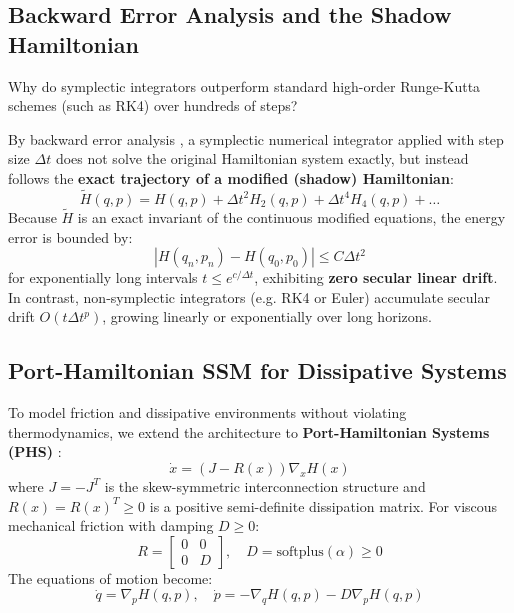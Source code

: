 \documentclass[11pt,a4paper]{article}
\begin{document}
\subsection{Backward Error Analysis and the Shadow Hamiltonian}
Why do symplectic integrators outperform standard high-order Runge-Kutta schemes (such as RK4) over hundreds of steps? 

By backward error analysis \cite{hairer2006geometric}, a symplectic numerical integrator applied with step size $\Delta t$ does not solve the original Hamiltonian system exactly, but instead follows the \textbf{exact trajectory of a modified (shadow) Hamiltonian}:
\begin{equation}
\tilde{H}(q, p) = H(q, p) + \Delta t^2 H_2(q, p) + \Delta t^4 H_4(q, p) + \dots
\end{equation}
Because $\tilde{H}$ is an exact invariant of the continuous modified equations, the energy error is bounded by:
\begin{equation}
|H(q_n, p_n) - H(q_0, p_0)| \le C \Delta t^2
\end{equation}
for exponentially long intervals $t \le e^{c / \Delta t}$, exhibiting \textbf{zero secular linear drift}. In contrast, non-symplectic integrators (e.g. RK4 or Euler) accumulate secular drift $O(t \Delta t^p)$, growing linearly or exponentially over long horizons.

\subsection{Port-Hamiltonian SSM for Dissipative Systems}
To model friction and dissipative environments without violating thermodynamics, we extend the architecture to \textbf{Port-Hamiltonian Systems (PHS)} \cite{vanderschaft2014port, eidnes2023pseudo}:
\begin{equation}
\dot{x} = (J - R(x)) \nabla_x H(x)
\end{equation}
where $J = -J^T$ is the skew-symmetric interconnection structure and $R(x) = R(x)^T \ge 0$ is a positive semi-definite dissipation matrix. For viscous mechanical friction with damping $D \ge 0$:
\begin{equation}
R = \begin{bmatrix} 0 & 0 \\ 0 & D \end{bmatrix}, \quad D = \text{softplus}(\alpha) \ge 0
\end{equation}
The equations of motion become:
\begin{equation}
\dot{q} = \nabla_p H(q, p), \quad \dot{p} = -\nabla_q H(q, p) - D \nabla_p H(q, p)
\end{equation}
\end{document}
